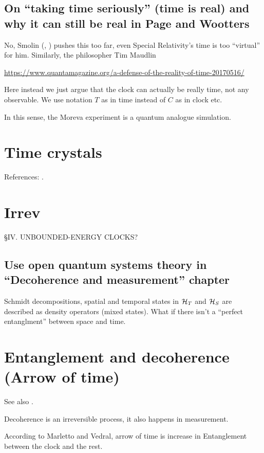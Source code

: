 \subsection{On ``taking time seriously'' (time is real) and why it can still be real in Page and Wootters}

No, Smolin
(, )
pushes this too far, even Special Relativity's time is too ``virtual'' for him.
Similarly, the philosopher Tim Maudlin

\url{https://www.quantamagazine.org/a-defense-of-the-reality-of-time-20170516/}

Here instead we just argue that the clock can actually be really time, not any observable.
We use notation $T$ as in time instead of $C$ as in clock etc.

In this sense, the Moreva experiment is a quantum analogue simulation.


\section{Time crystals}

References: \cite{crystal2,crystal3,crystal2012}.


\section{Irrev}

\cite{Maccone:Pauli} \S IV.  UNBOUNDED-ENERGY CLOCKS?

\subsection{Use open quantum systems theory in ``Decoherence and measurement'' chapter}
Schmidt decompositions, spatial and temporal states in
$\mathcal{H}_T$ and $\mathcal{H}_S$
are described as density operators
(mixed states). What if there isn't a ``perfect entanglment'' between space and time.

\section{Entanglement and decoherence (Arrow of time)}
See also \cite{EntanglementVsDecoherence}.

Decoherence is an irreversible process, it also happens in measurement.

According to Marletto and Vedral, arrow of time is increase in Entanglement
between the clock and the rest.

